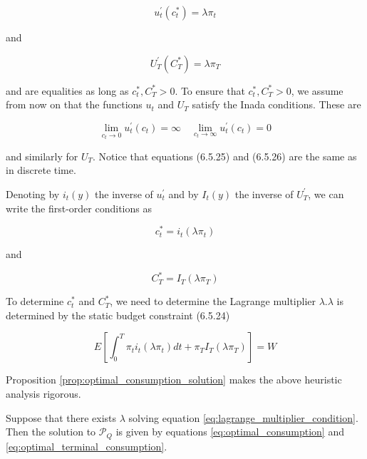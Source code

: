 \documentclass[\topdir/lecture\_notes.tex]{subfiles}
\begin{document}
\begin{equation}
u_{t}^{\prime}\left(c_{t}^{*}\right)=\lambda \pi_{t} \label{eq:6.5.25}
\end{equation}

and

\begin{equation}
U_{T}^{\prime}\left(C_{T}^{*}\right)=\lambda \pi_{T} \label{eq:6.5.26}
\end{equation}

and are equalities as long as $c_{t}^{*}, C_{T}^{*}>0$. To ensure that $c_{t}^{*}, C_{T}^{*}>0$, we assume from now on that the functions $u_{t}$ and $U_{T}$ satisfy the Inada conditions. These are

\begin{equation*}
\lim _{c_{t} \rightarrow 0} u_{t}^{\prime}\left(c_{t}\right)=\infty \quad \lim _{c_{t} \rightarrow \infty} u_{t}^{\prime}\left(c_{t}\right)=0
\end{equation*}

and similarly for $U_{T}$. Notice that equations (6.5.25) and (6.5.26) are the same as in discrete time.

Denoting by $i_{t}(y)$ the inverse of $u_{t}^{\prime}$ and by $I_{t}(y)$ the inverse of $U_{T}^{\prime}$, we can write the first-order conditions as

\begin{equation}
c_{t}^{*}=i_{t}\left(\lambda \pi_{t}\right) \label{eq:optimal_consumption}
\end{equation}

and

\begin{equation}
C_{T}^{*}=I_{T}\left(\lambda \pi_{T}\right) \label{eq:optimal_terminal_consumption}
\end{equation}

To determine $c_{t}^{*}$ and $C_{T}^{*}$, we need to determine the Lagrange multiplier $\lambda . \lambda$ is determined by the static budget constraint (6.5.24)

\begin{equation}
E\left[\int_{0}^{T} \pi_{t} i_{t}\left(\lambda \pi_{t}\right) d t+\pi_{T} I_{T}\left(\lambda \pi_{T}\right)\right]=W \label{eq:lagrange_multiplier_condition}
\end{equation}

Proposition \ref{prop:optimal_consumption_solution} makes the above heuristic analysis rigorous.

\begin{proposition}\label{prop:optimal_consumption_solution}
Suppose that there exists $\lambda$ solving equation \eqref{eq:lagrange_multiplier_condition}. Then the solution to $\mathcal{P}_{Q}$ is given by equations \eqref{eq:optimal_consumption} and \eqref{eq:optimal_terminal_consumption}.
\end{proposition}
\end{document}
